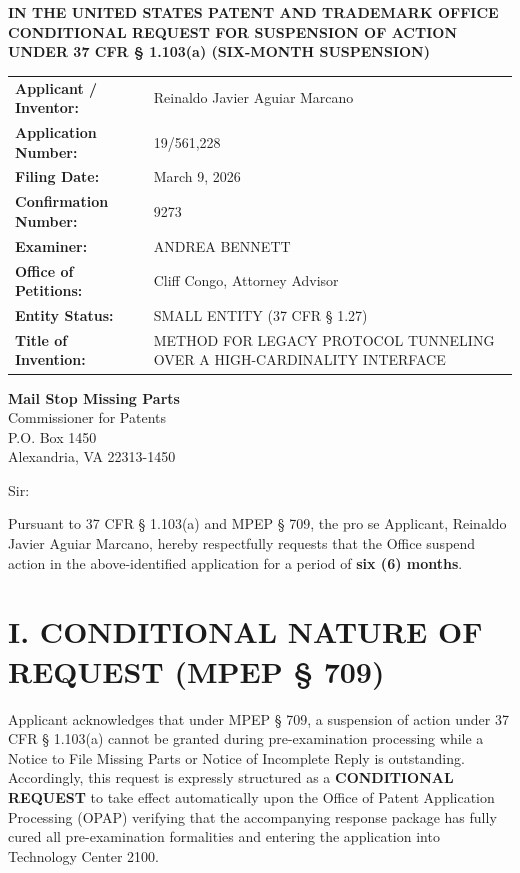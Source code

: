 \documentclass[11pt,letterpaper]{article}
\begin{document}
\thispagestyle{empty}

\begin{center}
    \textbf{\large IN THE UNITED STATES PATENT AND TRADEMARK OFFICE} \\
    \vspace{0.3cm}
    \textbf{\large CONDITIONAL REQUEST FOR SUSPENSION OF ACTION} \\
    \textbf{\normalsize UNDER 37 CFR \S{} 1.103(a) (SIX-MONTH SUSPENSION)}
\end{center}

\vspace{0.4cm}
\noindent\begin{tabular}{p{2.3in}p{4.0in}}
\textbf{Applicant / Inventor:} & Reinaldo Javier Aguiar Marcano \\
\textbf{Application Number:} & 19/561,228 \\
\textbf{Filing Date:} & March 9, 2026 \\
\textbf{Confirmation Number:} & 9273 \\
\textbf{Examiner:} & ANDREA BENNETT \\
\textbf{Office of Petitions:} & Cliff Congo, Attorney Advisor \\
\textbf{Entity Status:} & SMALL ENTITY (37 CFR \S{} 1.27) \\
\textbf{Title of Invention:} & METHOD FOR LEGACY PROTOCOL TUNNELING OVER A HIGH-CARDINALITY INTERFACE \\
\end{tabular}

\vspace{0.5cm}
\noindent\textbf{Mail Stop Missing Parts} \\
Commissioner for Patents \\
P.O. Box 1450 \\
Alexandria, VA 22313-1450

\vspace{0.2cm}
Sir:

Pursuant to 37 CFR \S{} 1.103(a) and MPEP \S{} 709, the pro se Applicant, Reinaldo Javier Aguiar Marcano, hereby respectfully requests that the Office suspend action in the above-identified application for a period of \textbf{six (6) months}.

\section*{I. CONDITIONAL NATURE OF REQUEST (MPEP \S{} 709)}

Applicant acknowledges that under MPEP \S{} 709, a suspension of action under 37 CFR \S{} 1.103(a) cannot be granted during pre-examination processing while a Notice to File Missing Parts or Notice of Incomplete Reply is outstanding. Accordingly, this request is expressly structured as a \textbf{CONDITIONAL REQUEST} to take effect automatically upon the Office of Patent Application Processing (OPAP) verifying that the accompanying response package has fully cured all pre-examination formalities and entering the application into Technology Center 2100.
\end{document}
